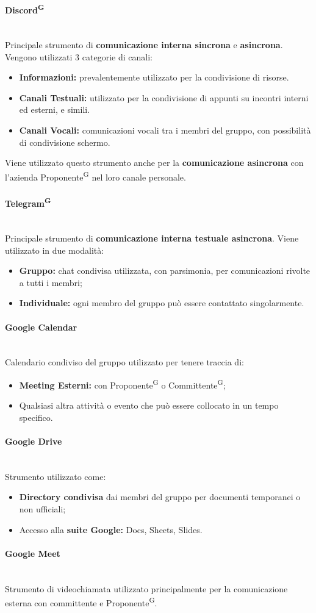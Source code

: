 \documentclass[8pt]{article}
\newcommand{\glossterm}[1]{#1\textsuperscript{G}} %
\newcommand{\subsubsubsection}[1]{\paragraph{#1}\mbox{}\\}
\begin{document}
\subsubsubsection{\glossterm{Discord}}
Principale strumento di \textbf{comunicazione interna sincrona} e \textbf{asincrona}. Vengono utilizzati 3 categorie di canali:
\begin{itemize}
  \item \textbf{Informazioni:} prevalentemente utilizzato per la condivisione di risorse.
  \item \textbf{Canali Testuali:} utilizzato per la condivisione di appunti su incontri interni ed esterni, e simili.
  \item \textbf{Canali Vocali:} comunicazioni vocali tra i membri del gruppo, con possibilità di condivisione schermo.
\end{itemize}
\medskip
Viene utilizzato questo strumento anche per la \textbf{comunicazione asincrona} con l'azienda
\glossterm{Proponente} nel loro canale personale.

\subsubsubsection{\glossterm{Telegram}}
Principale strumento di \textbf{comunicazione interna testuale asincrona}. Viene utilizzato in due modalità:
\begin{itemize}
  \item \textbf{Gruppo:} chat condivisa utilizzata, con parsimonia, per comunicazioni rivolte a tutti i membri;
  \item \textbf{Individuale:} ogni membro del gruppo può essere contattato singolarmente.
\end{itemize}
\medskip

\subsubsubsection{Google Calendar}
Calendario condiviso del gruppo utilizzato per tenere traccia di:
\begin{itemize}
    \item \textbf{Meeting Esterni:} con \glossterm{Proponente} o \glossterm{Committente};
  \item Qualsiasi altra attività o evento che può essere collocato in un tempo specifico.
\end{itemize}
 
\subsubsubsection{Google Drive}
Strumento utilizzato come:
\begin{itemize}
  \item \textbf{Directory condivisa} dai membri del gruppo per documenti temporanei o non ufficiali;
  \item Accesso alla \textbf{suite Google:} Docs, Sheets, Slides.
\end{itemize}

\subsubsubsection{Google Meet}
Strumento di videochiamata utilizzato principalmente per la comunicazione esterna con committente e
\glossterm{Proponente}.
\end{document}
